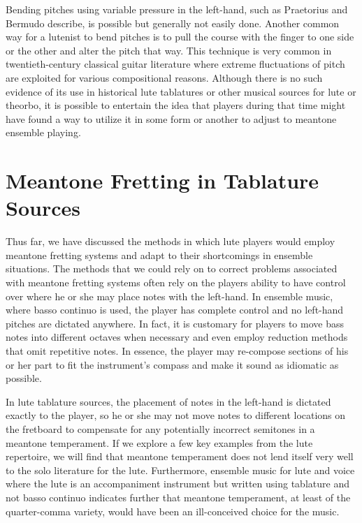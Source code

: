 Bending pitches using variable pressure in the left-hand, such as Praetorius and Bermudo
describe, is possible but generally not easily done.  Another common way for a lutenist to
bend pitches is to pull the course with the finger to one side or the other and alter the
pitch that way. This technique is very common in twentieth-century classical guitar
literature where extreme fluctuations of pitch are exploited for various compositional
reasons. Although there is no such evidence of its use in historical lute tablatures or
other musical sources for lute or theorbo, it is possible to entertain the idea that
players during that time might have found a way to utilize it in some form or another to
adjust to meantone ensemble playing.

\section{Meantone Fretting in Tablature Sources}

Thus far, we have discussed the methods in which lute players would employ meantone
fretting systems and adapt to their shortcomings in ensemble situations.  The methods that
we could rely on to correct problems associated with meantone fretting systems often rely
on the players ability to have control over where he or she may place notes with the
left-hand.  In ensemble music, where basso continuo is used, the player has complete
control and no left-hand pitches are dictated anywhere.  In fact, it is customary for
players to move bass notes into different octaves when necessary and even employ reduction
methods that omit repetitive notes.  In essence, the player may re-compose sections of his or
her part to fit the instrument's compass and make it sound as idiomatic as possible.

In lute tablature sources, the placement of notes in the left-hand is dictated exactly to
the player, so he or she may not move notes to different locations on the fretboard to
compensate for any potentially incorrect semitones in a meantone temperament.  If we
explore a few key examples from the lute repertoire, we will find that meantone
temperament does not lend itself very well to the solo literature for the lute.
Furthermore, ensemble music for lute and voice where the lute is an accompaniment
instrument but written using tablature and not basso continuo indicates further that
meantone temperament, at least of the quarter-comma variety, would have been an
ill-conceived choice for the music.

